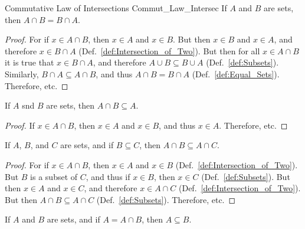             \begin{ltheorem}{Commutative Law of Intersections}
                            {Commut_Law_Intersec}
                If $A$ and $B$ are sets, then $A\cap{B}=B\cap{A}$.
            \end{ltheorem}
            \begin{proof}
                For if $x\in{A}\cap{B}$, then $x\in{A}$ and
                $x\in{B}$. But then $x\in{B}$ and $x\in{A}$,
                and therefore $x\in{B}\cap{A}$
                (Def.~\ref{def:Intersection_of_Two}). But then
                for all $x\in{A}\cap{B}$ it is true that
                $x\in{B}\cap{A}$, and therefore
                $A\cup{B}\subseteq{B}\cup{A}$
                (Def.~\ref{def:Subsets}). Similarly,
                $B\cap{A}\subseteq{A}\cap{B}$, and thus
                $A\cap{B}=B\cap{A}$ (Def.~\ref{def:Equal_Sets}).
                Therefore, etc.
            \end{proof}
            \begin{theorem}
                \label{thm:Intersection_is_Smaller}%
                If $A$ snd $B$ are sets, then
                $A\cap{B}\subseteq{A}$.
            \end{theorem}
            \begin{proof}
                If $x\in{A}\cap{B}$, then $x\in{A}$ and
                $x\in{B}$, and thus $x\in{A}$. Therefore, etc.
            \end{proof}
            \begin{theorem}
                \label{thm:Intersection_with_Lesser_Set}%
                If $A$, $B$, and $C$ are sets, and if
                $B\subseteq{C}$, then
                $A\cap{B}\subseteq{A}\cap{C}$.
            \end{theorem}
            \begin{proof}
                For if $x\in{A}\cap{B}$, then $x\in{A}$ and
                $x\in{B}$ (Def.~\ref{def:Intersection_of_Two}).
                But $B$ is a subset of $C$, and thus if
                $x\in{B}$, then $x\in{C}$
                (Def.~\ref{def:Subsets}). But then $x\in{A}$ and
                $x\in{C}$, and therefore $x\in{A}\cap{C}$
                (Def.~\ref{def:Intersection_of_Two}). But
                then $A\cap{B}\subseteq{A}\cap{C}$
                (Def.~\ref{def:Subsets}). Therefore, etc.
            \end{proof}
            \begin{theorem}
                \label{thm:Intersection_is_Equal}%
                If $A$ and $B$ are sets, and if
                $A=A\cap{B}$, then $A\subseteq{B}$.
            \end{theorem}
